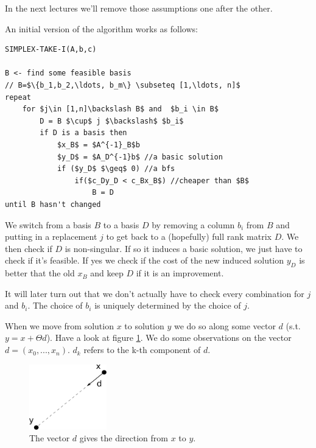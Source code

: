 In the next lectures we'll remove those assumptions one after the other.

An initial version of the algorithm works as follows:
\begin{center}
\begin{lstlisting}
SIMPLEX-TAKE-I(A,b,c)

B <- find some feasible basis
// B=$\{b_1,b_2,\ldots, b_m\} \subseteq [1,\ldots, n]$
repeat 
    for $j\in [1,n]\backslash B$ and  $b_i \in B$
        D = B $\cup$ j $\backslash$ $b_i$
        if D is a basis then
            $x_B$ = $A^{-1}_B$b
            $y_D$ = $A_D^{-1}b$ //a basic solution
            if ($y_D$ $\geq$ 0) //a bfs
                if($c_Dy_D < c_Bx_B$) //cheaper than $B$
                    B = D
until B hasn't changed                
\end{lstlisting}
\end{center}

We switch from a basis $B$ to a basis $D$ by removing a column $b_i$ from $B$ and putting in a replacement $j$ to get back to a (hopefully) full rank matrix $D$. We then check if $D$ is non-singular. If so it induces a basic solution, we just have to check if it's feasible. If yes we check if the cost of the new induced solution $y_D$ is better that the old $x_B$ and keep $D$ if it is an improvement.

It will later turn out that we don't actually have to check every combination for $j$ and $b_i$. The choice of $b_i$ is uniquely determined by the choice of $j$.



When we move from solution $x$ to solution $y$ we do so along some vector $d$ (s.t. $y=x+\Theta d$). Have a look at figure \ref{Fig:movingToSolutions}. We do some observations on the vector $d=(x_0,...,x_n)$. $d_k$ refers to the k-th component of $d$. 

\begin{figure}[hbt]
\begin{center}
\includegraphics[width=0.3\textwidth]{./images/movingToSolutions.pdf}
\end{center}
\caption{The vector $d$ gives the direction from $x$ to $y$.}
\label{Fig:movingToSolutions}
\end{figure}


